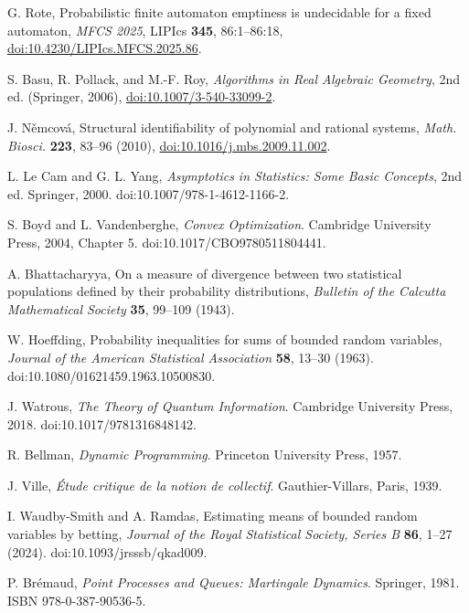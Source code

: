  G. Rote, Probabilistic finite automaton emptiness is undecidable for a fixed automaton, \emph{MFCS 2025}, LIPIcs \textbf{345}, 86:1--86:18, \href{https://doi.org/10.4230/LIPIcs.MFCS.2025.86}{doi:10.4230/LIPIcs.MFCS.2025.86}.

 S. Basu, R. Pollack, and M.-F. Roy, \emph{Algorithms in Real Algebraic Geometry}, 2nd ed. (Springer, 2006), \href{https://doi.org/10.1007/3-540-33099-2}{doi:10.1007/3-540-33099-2}.

 J. N\v{e}mcov\'a, Structural identifiability of polynomial and rational systems, \emph{Math. Biosci.} \textbf{223}, 83--96 (2010), \href{https://doi.org/10.1016/j.mbs.2009.11.002}{doi:10.1016/j.mbs.2009.11.002}.

L. Le Cam and G. L. Yang,
\emph{Asymptotics in Statistics: Some Basic Concepts}, 2nd ed.
Springer, 2000. doi:10.1007/978-1-4612-1166-2.

S. Boyd and L. Vandenberghe,
\emph{Convex Optimization}. Cambridge University Press, 2004,
Chapter 5. doi:10.1017/CBO9780511804441.

A. Bhattacharyya,
On a measure of divergence between two statistical populations defined by their
probability distributions,
\emph{Bulletin of the Calcutta Mathematical Society} \textbf{35}, 99--109 (1943).

W. Hoeffding,
Probability inequalities for sums of bounded random variables,
\emph{Journal of the American Statistical Association} \textbf{58}, 13--30 (1963).
doi:10.1080/01621459.1963.10500830.

J. Watrous,
\emph{The Theory of Quantum Information}. Cambridge University Press, 2018.
doi:10.1017/9781316848142.

R. Bellman,
\emph{Dynamic Programming}. Princeton University Press, 1957.

J. Ville,
\emph{\'Etude critique de la notion de collectif}.
Gauthier-Villars, Paris, 1939.

I. Waudby-Smith and A. Ramdas,
Estimating means of bounded random variables by betting,
\emph{Journal of the Royal Statistical Society, Series B}
\textbf{86}, 1--27 (2024). doi:10.1093/jrsssb/qkad009.

P. Br\'emaud,
\emph{Point Processes and Queues: Martingale Dynamics}.
Springer, 1981. ISBN 978-0-387-90536-5.

